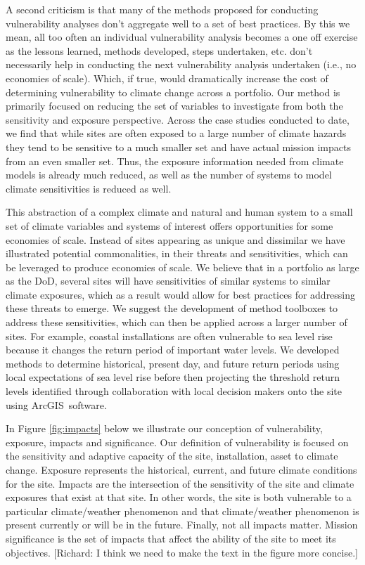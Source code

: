 \documentclass[10pt]{amsart}
\begin{document}
A second criticism is that many of the methods proposed for conducting vulnerability analyses don't aggregate well to a set of best practices.
By this we mean, all too often an individual vulnerability analysis becomes a one off exercise as the lessons learned, methods developed, steps undertaken, etc. don't necessarily help in conducting the next vulnerability analysis undertaken (i.e., no economies of scale). 
Which, if true, would dramatically increase the cost of determining vulnerability to climate change across a portfolio.
Our method is primarily focused on reducing the set of variables to investigate from both the sensitivity and exposure perspective.
Across the case studies conducted to date, we find that while sites are often exposed to a large number of climate hazards they tend to be sensitive to a much smaller set and have actual mission impacts from an even smaller set.
Thus, the exposure information needed from climate models is already much reduced, as well as the number of systems to model climate sensitivities is reduced as well.

This abstraction of a complex climate and natural and human system to a small set of climate variables and systems of interest offers opportunities for some economies of scale. 
Instead of sites appearing as unique and dissimilar we have illustrated potential commonalities, in their threats and sensitivities, which can be leveraged to produce economies of scale. 
We believe that in a portfolio as large as the DoD, several sites will have sensitivities of similar systems to similar climate exposures, which as a result would allow for best practices for addressing these threats to emerge. 
We suggest the development of method toolboxes to address these sensitivities, which can then be applied across a larger number of sites.
For example, coastal installations are often vulnerable to sea level rise because it changes the return period of important water levels.
We developed methods to determine historical, present day, and future return periods using local expectations of sea level rise before then projecting the threshold return levels identified through collaboration with local decision makers onto the site using ArcGIS\texttrademark\ software.

In Figure \ref{fig:impacts} below we illustrate our conception of vulnerability, exposure, impacts and significance.
Our definition of vulnerability is focused on the sensitivity and adaptive capacity of the site, installation, asset to climate change.
Exposure represents the historical, current, and future climate conditions for the site.
Impacts are the intersection of the sensitivity of the site and climate exposures that exist at that site.
In other words, the site is both vulnerable to a particular climate/weather phenomenon and that climate/weather phenomenon is present currently or will be in the future.
Finally, not all impacts matter.
Mission significance is the set of impacts that affect the ability of the site to meet its objectives.
[Richard: I think we need to make the text in the figure more concise.]
\end{document}
